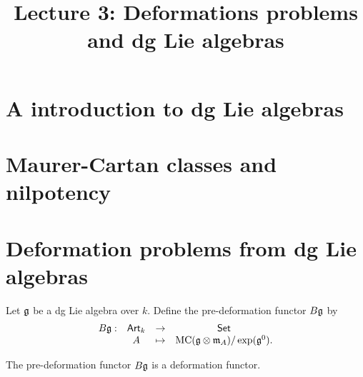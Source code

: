 \documentclass[11pt]{amsart}
\title{Lecture 3: Deformations problems and dg Lie algebras}
\begin{document}
\maketitle

\section{A introduction to dg Lie algebras}

\section{Maurer-Cartan classes and nilpotency}

\section{Deformation problems from dg Lie algebras}

\begin{dfn}
Let $\mathfrak g$ be a dg Lie algebra over $k$. 
Define the pre-deformation functor $B \mathfrak g$ by
\[
\begin{array}{cccc}
B \mathfrak g : & {\sf Art}_k & \to & {\sf Set} \\
 & A & \mapsto & {\rm MC}(\mathfrak g \otimes {\mathfrak m}_A) / \exp(\mathfrak g^0) .
 \end{array}
\]
\end{dfn}

\begin{prop}
The pre-deformation functor $B \mathfrak g$ is a deformation functor.
\end{prop}
\end{document}
